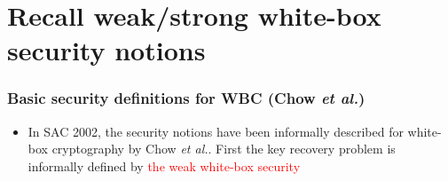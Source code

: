\documentclass[aspectratio=169,xcolor=dvipsnames]{beamer}
\begin{document}
\section{Recall weak/strong white-box security notions}
\frame
{
\frametitle{Basic security definitions for WBC (Chow \textit{et al.})}
\begin{itemize}
\item In SAC 2002, the security notions have  been informally described for white-box cryptography by Chow \textit{et al.}. First the key recovery problem is informally defined by \textcolor{red}{the weak white-box security}
\end{itemize}


\begin{center}
\end{center}
}
\end{document}
